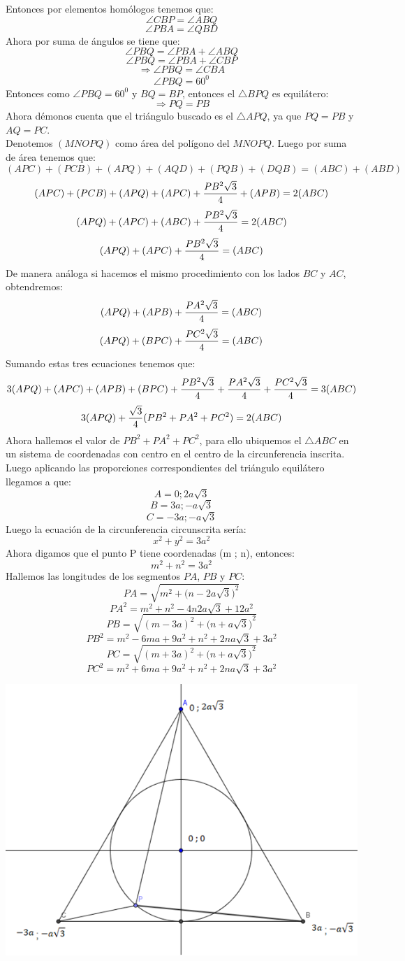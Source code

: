 \documentclass{book}
\begin{document}
\begin{enumerate}
\begin{center}
					\end{center}
					Entonces por elementos homólogos tenemos que: 
$$\angle CBP=\angle ABQ$$
$$\angle PBA=\angle QBD$$
Ahora por suma de ángulos se tiene que:
$$\angle PBQ=\angle PBA+\angle ABQ$$
$$\angle PBQ=\angle PBA+\angle CBP$$
$$\Rightarrow\angle PBQ=\angle CBA$$
$$\angle PBQ=60^0$$
Entonces como $\angle PBQ=60^0$ y $BQ=BP$, entonces el $\triangle BPQ$ es equilátero:
$$\Rightarrow PQ=PB$$
Ahora démonos cuenta que el triángulo buscado es el $\triangle APQ$, ya que $PQ=PB$ y $AQ=PC$.\\
					Denotemos $(MNOPQ)$ como área del polígono del $MNOPQ$.
Luego por suma de área tenemos que:
$$(APC)+(PCB)+(APQ)+(AQD)+(PQB)+(DQB)=(ABC)+(ABD)$$
$$(APC)+(PCB)+(APQ)+(APC)+{PB^2\sqrt{3}\over 4}+(APB)=2(ABC)$$
$$(APQ)+(APC)+(ABC)+{PB^2\sqrt{3}\over 4}=2(ABC)$$
$$(APQ)+(APC)+{PB^2\sqrt{3}\over 4}=(ABC)$$
De manera análoga si hacemos el mismo procedimiento con los lados $BC$ y $AC$, obtendremos:
$$(APQ)+(APB)+{PA^2\sqrt{3}\over 4}=(ABC)$$
$$(APQ)+(BPC)+{PC^2\sqrt{3}\over 4}=(ABC)$$
Sumando estas tres ecuaciones tenemos que:
$$3(APQ)+(APC)+(APB)+(BPC)+{PB^2\sqrt{3}\over 4}+{PA^2\sqrt{3}\over 4}+{PC^2\sqrt{3}\over 4}=3(ABC)$$
$$3(APQ)+{\sqrt{3}\over 4} (PB^2+PA^2+PC^2 )=2(ABC)$$
Ahora hallemos el valor de $PB^2+PA^2+PC^2$, para ello ubiquemos el $\triangle ABC$ en un sistema de coordenadas con centro en el centro de la circunferencia inscrita. Luego aplicando las proporciones correspondientes del triángulo equilátero llegamos  a que:
$$A=0 ;2a\sqrt{3}$$
$$B=3a ; -a\sqrt{3}$$
$$C=-3a ; -a\sqrt{3}$$
Luego la ecuación de la circunferencia circunscrita sería:
$$x^2+y^2=3a^2$$
Ahora digamos que el punto P tiene coordenadas (m ; n), entonces:
$$m^2+n^2=3a^2$$
Hallemos las longitudes de los segmentos $PA$, $PB$ y $PC$:
$$PA=\sqrt{m^2+{\big(n-2a\sqrt{3}\big)}^2 }$$
$$PA^2=m^2+n^2-4n2a\sqrt{3}+12a^2$$
$$PB=\sqrt{{(m-3a)}^2+{\big(n+a\sqrt{3}\big)}^2 }$$
$$PB^2=m^2-6ma+9a^2+n^2+2na\sqrt{3}+3a^2$$
$$PC=\sqrt{{(m+3a)}^2+{\big(n+a\sqrt{3}\big)}^2 }$$
$$PC^2=m^2+6ma+9a^2+n^2+2na\sqrt{3}+3a^2$$
					\begin{center}
							\includegraphics[scale=1]{imagenes/Geometria/24,2.png}

\end{center}
\end{enumerate}
\end{document}
